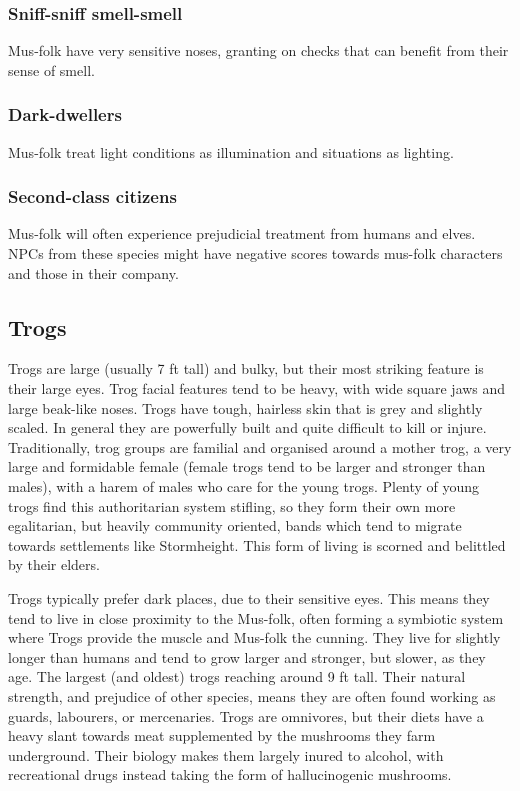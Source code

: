 \documentclass[a4paper,11pt,oneside]{book}
\newcommand{\textlf}[1]{\textbf{\titlecap{#1}}}
\begin{document}
\subsubsection*{Sniff-sniff smell-smell}
Mus-folk have very sensitive noses, granting \textlf{edge+} on \textlf{awareness} checks that can benefit from their sense of smell.

\subsubsection*{Dark-dwellers}
Mus-folk treat \textlf{low} light conditions as \textlf{full} illumination and \textlf{dark} situations as \textlf{low} lighting.

\subsubsection*{Second-class citizens}
Mus-folk will often experience prejudicial treatment from humans and elves. NPCs from these species might have negative \textlf{attitude} scores towards mus-folk characters  and those in their company.


\subsection{Trogs}
Trogs are large (usually 7 ft tall) and bulky, but their most striking feature is their large eyes. Trog facial features tend to be heavy, with wide square jaws and large beak-like noses. Trogs have tough, hairless skin that is grey and slightly scaled. In general they are powerfully built and quite difficult to kill or injure.  Traditionally, trog groups are familial and organised around a mother trog, a very large and formidable female (female trogs tend to be larger and stronger than males), with a harem of males who care for the young trogs. Plenty of young trogs find this authoritarian system stifling, so they form their own more egalitarian, but heavily community oriented, bands which tend to migrate towards settlements like Stormheight. This form of living is scorned and belittled by their elders. 

Trogs typically prefer dark places, due to their sensitive eyes. This means they tend to live in close proximity to the Mus-folk, often forming a symbiotic system where Trogs provide the muscle and Mus-folk the cunning. They live for slightly longer than humans and tend to grow larger and stronger, but slower, as they age. The largest (and oldest) trogs reaching around 9 ft tall. Their natural strength, and prejudice of other species, means they are often found working as guards, labourers, or mercenaries. Trogs are omnivores, but their diets have a heavy slant towards meat supplemented by the mushrooms they farm underground. Their biology makes them largely inured to alcohol, with recreational drugs instead taking the form of hallucinogenic mushrooms. 
\end{document}
